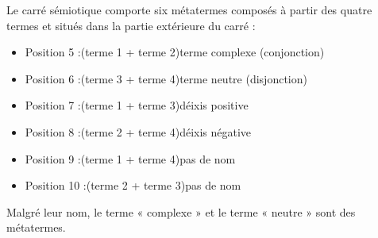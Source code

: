 Le carré sémiotique comporte six métatermes composés à partir des quatre termes et situés dans la partie extérieure du carré :
\begin{itemize}
\item Position 5 :\quad (terme 1 + terme 2)\quad terme complexe (conjonction)
\item Position 6 :\quad (terme 3 + terme 4)\quad terme neutre (disjonction)
\item Position 7 :\quad (terme 1 + terme 3)\quad déixis positive
\item Position 8 :\quad (terme 2 + terme 4)\quad déixis négative
\item Position 9 :\quad (terme 1 + terme 4)\quad pas de nom
\item Position 10 :\quad (terme 2 + terme 3)\quad pas de nom
\end{itemize}
Malgré leur nom, le terme « complexe » et le terme « neutre » sont des métatermes.

